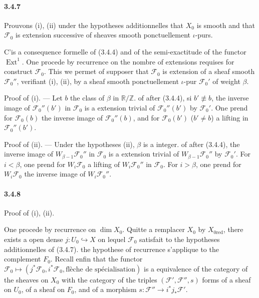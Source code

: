 \documentclass[12pt,a4paper]{article}
\theoremstyle{plain}
\theoremstyle{definition}
\theoremstyle{remark}
\DeclareMathOperator{\Ext}{Ext}
\newcommand{\RR}{{\mathbb{R}}}
\newcommand{\ZZ}{{\mathbb{Z}}}
\begin{document}
\paragraph{3.4.7}
Prouvons (i), (ii) under the hypotheses additionnelles that $X_0$ is smooth and that $\mathscr{F}_0$ is extension successive of sheaves smooth ponctuellement $\iota$-purs.


C'is a consequence formelle of (3.4.4) and of the semi-exactitude of the functor $\Ext^1$. One procede by recurrence on the nombre of extensions requises for construct $\mathscr{F}_0$. This we permet of supposer that $\mathscr{F}_0$ is extension of a sheaf smooth $\mathscr{F}_0''$, verifiant (i), (ii), by a sheaf smooth ponctuellement $\iota$-pur $\mathscr{F}_0'$ of weight $\beta$.

Proof of (i). --- Let $b$ the class of $\beta$ in $\RR/\ZZ$. of after (3.4.4), si $b' \not\equiv b$, the inverse image of $\mathscr{F}_0''(b')$ in $\mathscr{F}_0$ is a extension trivial of $\mathscr{F}_0''(b')$ by $\mathscr{F}_0'$. One prend for $\mathscr{F}_0(b)$ the inverse image of $\mathscr{F}_0''(b)$, and for $\mathscr{F}_0(b')$ ($b' \neq b$) a lifting in $\mathscr{F}_0''(b')$.

Proof of (ii). --- Under the hypotheses (ii), $\beta$ is a integer. of after (3.4.4), the inverse image of $W_{\beta-1}\mathscr{F}_0''$ in $\mathscr{F}_0$ is a extension trivial of $W_{\beta-1}\mathscr{F}_0''$ by $\mathscr{F}_0'$. For $i < \beta$, one prend for $W_i\mathscr{F}_0$ a lifting of $W_i\mathscr{F}_0''$ in $\mathscr{F}_0$. For $i > \beta$, one prend for $W_i\mathscr{F}_0$ the inverse image of $W_i\mathscr{F}_0''$.

\paragraph{3.4.8}
Proof of (i), (ii).


One procede by recurrence on $\dim X_0$. Quitte a remplacer $X_0$ by $X_{0\text{red}}$, there exists a open dense $j : U_0 \hookrightarrow X$ on lequel $\mathscr{F}_0$ satisfait to the hypotheses additionnelles of (3.4.7). the hypothese of recurrence s'applique to the complement $F_0$. Recall enfin that the functor $\mathscr{F}_0 \mapsto (j^*\mathscr{F}_0, i^*\mathscr{F}_0, \text{fl\`eche de sp\'ecialisation})$ is a equivalence of the category of the sheaves on $X_0$ with the category of the triples $(\mathscr{F}', \mathscr{F}'', s)$ forms of a sheaf on $U_0$, of a sheaf on $F_0$, and of a morphism $s : \mathscr{F}'' \to i^* j_* \mathscr{F}'$.
\end{document}
